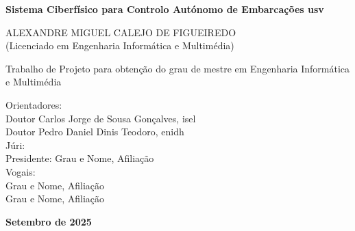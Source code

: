 \begin{titlepage}
	\vspace*{1cm}	
	\begin{center}
		\LARGE
		\textbf{Sistema Ciberfísico para Controlo Autónomo de Embarcações \acrlong{usv}}\\\vspace{36pt}
	\end{center}\vfill

	\begin{center}
		\Large
		ALEXANDRE MIGUEL CALEJO DE FIGUEIREDO\\
		\large
		(Licenciado em Engenharia Informática e Multimédia)
	\end{center}\vfill

	\begin{center}
		\normalsize
        Trabalho de Projeto para obtenção do grau de mestre em Engenharia Informática e Multimédia
	\end{center}\vfill
	
	\normalsize
	\noindent\hspace*{3.5cm}
	Orientadores:\\
	\noindent\hspace*{5.5cm}
	Doutor Carlos Jorge de Sousa Gonçalves, \acrshort{isel}\\
	\noindent\hspace*{5.5cm}
	Doutor Pedro Daniel Dinis Teodoro, \acrshort{enidh}\\
	
	\noindent\hspace*{3.5cm}
	Júri:\\
	\noindent\hspace*{4.2cm}
	Presidente: Grau e Nome, Afiliação\\
	\noindent\hspace*{4.2cm}
	Vogais:\\
	\noindent\hspace*{5.5cm}
	Grau e Nome, Afiliação\\
	\noindent\hspace*{5.5cm}
	Grau e Nome, Afiliação\\
	
	\vfill
	\begin{center}
		\textbf{Setembro de 2025}
	\end{center}
\end{titlepage}

\thispagestyle{empty} %

\thispagestyle{empty} %

\linespread{1.3}







